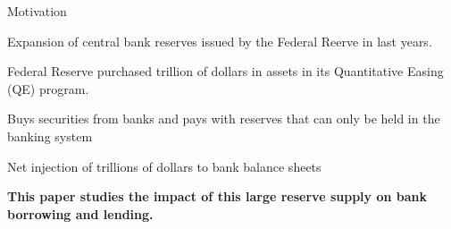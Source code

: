 \documentclass[notes,11pt, aspectratio=169]{beamer}
\newenvironment{wideitemize}{\itemize\addtolength{\itemsep}{10pt}}{\enditemize}
\begin{document}


    

    
\begin{frame}{Motivation}
\begin{wideitemize}
    \item Expansion of central bank reserves issued by the Federal Reerve in last years. 
    \item Federal Reserve purchased trillion of dollars in assets in its Quantitative Easing (QE) program.
    \begin{wideitemize}
        \item Buys securities from banks and pays with reserves that can only be held in the banking system
    \end{wideitemize}
    \item Net injection of trillions of dollars to bank balance sheets
    
    \item \textbf{This paper studies the impact of this large reserve supply on bank borrowing and lending.}

\end{wideitemize}
    
\end{frame}
\end{document}
